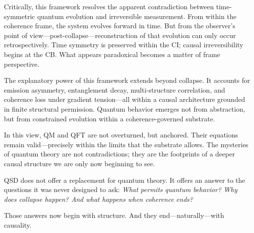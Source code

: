 \documentclass[preprints,article,submit,pdftex,moreauthors]{Definitions/mdpi}
\begin{document}
Critically, this framework resolves the apparent contradiction between time-symmetric quantum evolution and irreversible measurement. From within the coherence frame, the system evolves forward in time. But from the observer’s point of view—post-collapse—reconstruction of that evolution can only occur retrospectively. Time symmetry is preserved within the CI; causal irreversibility begins at the CB. What appears paradoxical becomes a matter of frame perspective.

The explanatory power of this framework extends beyond collapse. It accounts for emission asymmetry, entanglement decay, multi-structure correlation, and coherence loss under gradient tension—all within a causal architecture grounded in finite structural permission. Quantum behavior emerges not from abstraction, but from constrained evolution within a coherence-governed substrate.

In this view, QM and QFT are not overturned, but anchored. Their equations remain valid—precisely within the limits that the substrate allows. The mysteries of quantum theory are not contradictions; they are the footprints of a deeper causal structure we are only now beginning to see.

\smallskip

QSD does not offer a replacement for quantum theory. It offers an answer to the questions it was never designed to ask:  
\textit{What permits quantum behavior?  
Why does collapse happen?  
And what happens when coherence ends?}

Those answers now begin with structure. And they end—naturally—with causality.


\vspace{6pt} 



\end{document}
